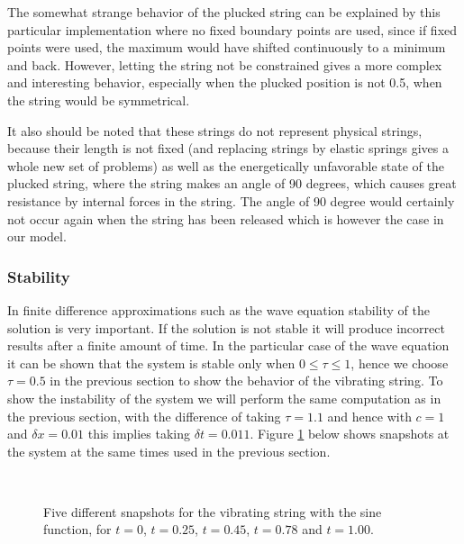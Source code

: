 \documentclass[11pt,a4paper,onecolumn]{article}
\begin{document}
The somewhat strange behavior of the plucked string can be explained by this particular implementation where no fixed boundary points are used, since if fixed points were used, the maximum would have shifted continuously to a minimum and back. However, letting the string not be constrained gives a more complex and interesting behavior, especially when the plucked position is not 0.5, when the string would be symmetrical.

It also should be noted that these strings do not represent physical strings, because their length is not fixed (and replacing strings by elastic springs gives a whole new set of problems) as well as the energetically unfavorable state of the plucked string, where the string makes an angle of 90 degrees, which causes great resistance by internal forces in the string. The angle of 90 degree would certainly not occur again when the string has been released which is however the case in our model.

\subsubsection{Stability}
In finite difference approximations such as the wave equation stability of the solution is very important. If the solution is not stable it will produce incorrect results after a finite amount of time. In the particular case of the wave equation it can be shown that the system is stable only when $0 \leq \tau \leq 1$, hence we choose $\tau = 0.5$ in the previous section to show the behavior of the vibrating string. To show the instability of the system we will perform the same computation as in the previous section, with the difference of taking $\tau = 1.1$ and hence with $c = 1$ and $\delta x = 0.01$ this implies taking $\delta t = 0.011$. Figure \ref{fig:chaos} below shows snapshots at the system at the same times used in the previous section.

\begin{figure}[H]
  \centering
  \\
  \caption{Five different snapshots for the vibrating string with the sine function, for $t = 0$, $t = 0.25$, $t = 0.45$, $t = 0.78$ and $t = 1.00$.}
  \label{fig:chaos}
\end{figure}
\end{document}
